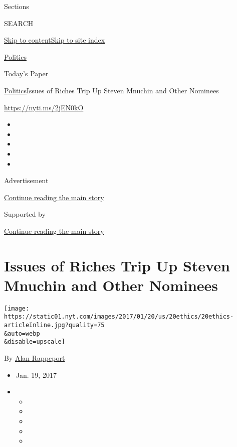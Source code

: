 Sections

SEARCH

\protect\hyperlink{site-content}{Skip to
content}\protect\hyperlink{site-index}{Skip to site index}

\href{https://www.nytimes.com/section/politics}{Politics}

\href{https://myaccount.nytimes.com/auth/login?response_type=cookie\&client_id=vi}{}

\href{https://www.nytimes.com/section/todayspaper}{Today's Paper}

\href{/section/politics}{Politics}\textbar{}Issues of Riches Trip Up
Steven Mnuchin and Other Nominees

\url{https://nyti.ms/2jEN0kO}

\begin{itemize}
\item
\item
\item
\item
\item
\end{itemize}

Advertisement

\protect\hyperlink{after-top}{Continue reading the main story}

Supported by

\protect\hyperlink{after-sponsor}{Continue reading the main story}

\hypertarget{issues-of-riches-trip-up-steven-mnuchin-and-other-nominees}{%
\section{Issues of Riches Trip Up Steven Mnuchin and Other
Nominees}\label{issues-of-riches-trip-up-steven-mnuchin-and-other-nominees}}

\texttt{[image: https://static01.nyt.com/images/2017/01/20/us/20ethics/20ethics-articleInline.jpg?quality=75\\\&auto=webp\\\&disable=upscale]}

By \href{https://www.nytimes.com/by/alan-rappeport}{Alan Rappeport}

\begin{itemize}
\item
  Jan. 19, 2017
\item
  \begin{itemize}
  \item
  \item
  \item
  \item
  \item
  \end{itemize}
\end{itemize}

